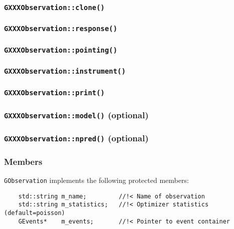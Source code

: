 \documentclass{article}[12pt,a4]
\begin{document}
\subsubsection{{\tt GXXXObservation::clone()}}

\subsubsection{{\tt GXXXObservation::response()}}

\subsubsection{{\tt GXXXObservation::pointing()}}

\subsubsection{{\tt GXXXObservation::instrument()}}

\subsubsection{{\tt GXXXObservation::print()}}

\subsubsection{{\tt GXXXObservation::model()} (optional)}

\subsubsection{{\tt GXXXObservation::npred()} (optional)}

\subsubsection{Members}

{\tt GObservation} implements the following protected members:

\begin{verbatim}
    std::string m_name;         //!< Name of observation
    std::string m_statistics;   //!< Optimizer statistics (default=poisson)
    GEvents*    m_events;       //!< Pointer to event container
\end{verbatim}
\end{document}
